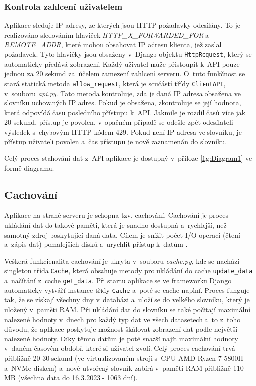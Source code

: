 \subsubsection*{Kontrola zahlcení uživatelem}
\label{APIsecurity}
Aplikace sleduje IP adresy, ze kterých jsou HTTP požadavky odesílány. To je realizováno sledováním hlaviček \emph{HTTP\_X\_FORWARDED\_FOR} a \emph{REMOTE\_ADDR}, které mohou obsahovat IP adresu klienta, jež zaslal požadavek. Tyto hlavičky jsou obsaženy v~Django objektu \lstinline{HttpRequest}, který se automaticky předává zobrazení. Každý uživatel může přistoupit k~API pouze jednou za 20 sekund za~účelem zamezení zahlcení serveru. O~tuto funkčnost se stará statická metoda \lstinline{allow_request}, která je součástí třídy \lstinline{ClientAPI}, v~souboru \emph{api.py}. Tato metoda kontroluje, zda je daná IP adresa obsažena ve slovníku uchovaných IP adres. Pokud je obsažena, zkontroluje se její hodnota, která odpovídá času posledního přístupu k~API. Jakmile je rozdíl časů více jak 20 sekund, přístup je povolen, v~opačném případě se odešle zpět odesílateli výsledek s~chybovým HTTP kódem 429. Pokud není IP adresa ve slovníku, je přístup uživateli povolen a~čas přístupu je nově zaznamenán do slovníku.

Celý proces stahování dat z~API aplikace je dostupný v~příloze \ref{fig:Diagram1} ve formě diagramu.

\subsection{Cachování}
\label{cache}

Aplikace na straně serveru je schopna tzv. cachování. Cachování je proces ukládání dat do takové paměti, která je snadno dostupná a~rychlejší, než samotný zdroj poskytující daná data. Cílem je snížit počet I/O operací (čtení a~zápis dat) pomalejších disků a~urychlit přístup k~datům \cite{auth0-caching}.

Veškerá funkcionalita cachování je ukryta v~souboru \emph{cache.py}, kde se nachází singleton třída \lstinline{Cache}, která obsahuje metody pro ukládání do cache \lstinline{update_data} a~načítání z~cache \lstinline{get_data}. Při startu aplikace se ve frameworku Django automaticky vytváří instance třídy \lstinline{Cache} a~poté se cache naplní. Proces funguje tak, že se získají všechny dny v~databázi a~uloží se do velkého slovníku, který je uložený v~paměti RAM. Při ukládání dat do slovníku se také počítají maximální nalezené hodnoty v~dnech pro každý typ dat ve všech datasetech a~to z~toho důvodu, že aplikace poskytuje možnost škálovat zobrazení dat podle největší nalezené hodnoty. Díky těmto datům je poté snazší najít maximální hodnoty v~daném časovém období, které si uživatel zvolí. Celý proces cachování trvá přibližně 20-30 sekund (ve virtualizovaném stroji s~CPU AMD Ryzen 7 5800H a~NVMe diskem) a~nově utvořený slovník zabírá v~paměti RAM přibližně 110 MB (všechna data do 16.3.2023 - 1063 dní). 

